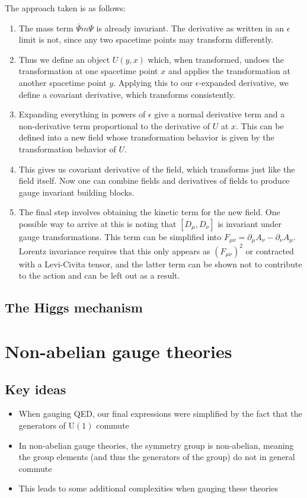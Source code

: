 \documentclass[12pt]{memoir}
\begin{document}
The approach taken is as follows:
\begin{enumerate}
  \item The mass term $\bar{\Psi}m\Psi$ is already invariant.
    The derivative as written in an $\epsilon$ limit is not,
    since any two spacetime points may transform differently.
  \item Thus we define an object $U(y, x)$
    which, when transformed,
    undoes the transformation at one spacetime point $x$
    and applies the transformation at another spacetime point $y$.
    Applying this to our $\epsilon$-expanded derivative, we define a covariant derivative,
    which transforms consistently.
  \item Expanding everything in powers of $\epsilon$ give a normal derivative term
    and a non-derivative term proportional to the derivative of $U$ at $x$.
    This can be defined into a new field whose transformation behavior is given by the transformation behavior of $U$.
  \item This gives us covariant derivative of the field, which transforms just like the field itself.
    Now one can combine fields and derivatives of fields to produce gauge invariant building blocks.
  \item The final step involves obtaining the kinetic term for the new field.
    One possible way to arrive at this is noting that $[D_{\mu}, D_{\nu}]$ is invariant under gauge transformations.
    This term can be simplified into $F_{\mu\nu}=\partial_{\mu}A_{\nu} - \partial_{\nu}A_{\mu}$.
    Lorentz invariance requires that this only appears as $(F_{\mu\nu})^2$ or contracted with a Levi-Civita tensor,
    and the latter term can be shown not to contribute to the action and can be left out as a result.
\end{enumerate}

\section{The Higgs mechanism}

\chapter{Non-abelian gauge theories}

\section{Key ideas}

\begin{itemize}
  \item When gauging QED, our final expressions were simplified by the fact that the generators of $\text{U}(1)$ commute
  \item In non-abelian gauge theories, the symmetry group is non-abelian,
    meaning the group elements (and thus the generators of the group) do not in general commute
  \item This leads to some additional complexities when gauging these theories
\end{itemize}
\end{document}
